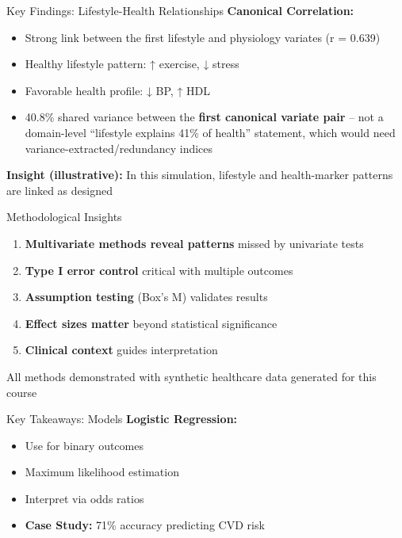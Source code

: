 \documentclass[aspectratio=169,ignorenonframetext]{beamer}
\begin{document}
\begin{frame}{Key Findings: Lifestyle-Health Relationships}
\textbf{Canonical Correlation:}

\begin{itemize}
\item
  Strong link between the first lifestyle and physiology variates (r =
  0.639)
\item
  Healthy lifestyle pattern: ↑ exercise, ↓ stress
\item
  Favorable health profile: ↓ BP, ↑ HDL
\item
  40.8\% shared variance between the \textbf{first canonical variate
  pair} -- not a domain-level ``lifestyle explains 41\% of health''
  statement, which would need variance-extracted/redundancy indices
\end{itemize}

\textbf{Insight (illustrative):} In this simulation, lifestyle and
health-marker patterns are linked as designed
\end{frame}

\begin{frame}{Methodological Insights}
\begin{enumerate}
\item
  \textbf{Multivariate methods reveal patterns} missed by univariate
  tests
\item
  \textbf{Type I error control} critical with multiple outcomes
\item
  \textbf{Assumption testing} (Box's M) validates results
\item
  \textbf{Effect sizes matter} beyond statistical significance
\item
  \textbf{Clinical context} guides interpretation
\end{enumerate}

All methods demonstrated with synthetic healthcare data generated for
this course
\end{frame}

\begin{frame}{Key Takeaways: Models}
\textbf{Logistic Regression:}

\begin{itemize}
\item
  Use for binary outcomes
\item
  Maximum likelihood estimation
\item
  Interpret via odds ratios
\item
  \textbf{Case Study:} 71\% accuracy predicting CVD risk
\end{itemize}
\end{frame}
\end{document}
